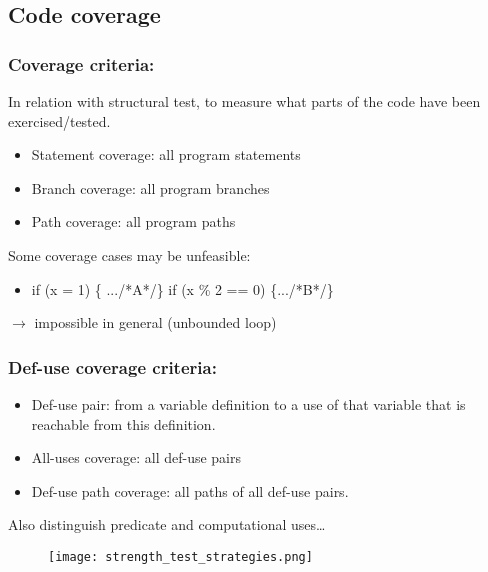 \subsection{Code coverage}

\subsubsection{Coverage criteria:}
In relation with structural test, to measure what parts of the code have been
exercised/tested.

\begin{itemize}
    \item Statement coverage: all program statements
    \item Branch coverage: all program branches
    \item Path coverage: all program paths
\end{itemize}
Some coverage cases may be unfeasible:
\begin{itemize}
	\item if (x = 1) \{ .../*A*/\}\newline
	if (x \% 2 == 0) \{.../*B*/\}
\end{itemize}

$\rightarrow$ impossible in general (unbounded loop)

\subsubsection{Def-use coverage criteria:}

\begin{itemize}
    \item Def-use pair: from a variable definition to a use of that variable that is reachable from this definition.
    \item All-uses coverage: all def-use pairs
    \item Def-use path coverage: all paths of all def-use pairs.
\end{itemize}

Also distinguish predicate and computational uses\ldots

\begin{figure}[!ht]
    \centering
    \texttt{[image: strength\_test\_strategies.png]}
\end{figure}
